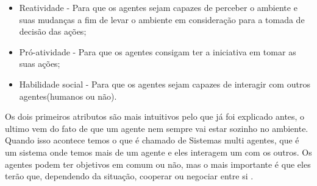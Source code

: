 \begin{itemize}
	\item Reatividade - Para que os agentes sejam capazes de perceber o ambiente e suas mudanças a fim de levar o ambiente em consideração para a tomada de decisão das ações;
	\item Pró-atividade - Para que os agentes consigam ter a iniciativa em tomar as suas ações;
	\item Habilidade social - Para que os agentes sejam capazes de interagir com outros agentes(humanos ou não).
\end{itemize}

Os dois primeiros atributos são mais intuitivos pelo que já foi explicado antes, o ultimo vem do fato de que um agente nem sempre vai estar sozinho no ambiente. Quando isso acontece temos o que é chamado de Sistemas multi agentes, que é um sistema onde temos mais de um agente e eles interagem um com os outros. Os agentes podem ter objetivos em comum ou não, mas o mais importante é que eles terão que, dependendo da situação, cooperar ou negociar entre si \cite{intelligence2003modern}.    


